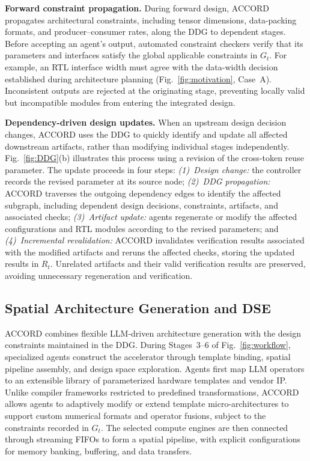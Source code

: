 \documentclass[9pt,conference]{IEEEtran}
\begin{document}
\textbf{Forward constraint propagation.}
During forward design, ACCORD propagates architectural constraints, including tensor dimensions, data-packing formats, and producer--consumer rates, along the DDG to dependent stages. Before accepting an agent's output, automated constraint checkers verify that its parameters and interfaces satisfy the global applicable constraints in $G_t$. For example, an RTL interface width must agree with the data-width decision established during architecture planning (Fig.~\ref{fig:motivation}, Case~A). Inconsistent outputs are rejected at the originating stage, preventing locally valid but incompatible modules from entering the integrated design.

\textbf{Dependency-driven design updates.}
When an upstream design decision changes, ACCORD uses the DDG to quickly identify and update all affected downstream artifacts, rather than modifying individual stages independently. Fig.~\ref{fig:DDG}(b) illustrates this process using a revision of the cross-token reuse parameter. The update proceeds in four steps:
\emph{(1)~Design change:} the controller records the revised parameter at its source node;
\emph{(2)~DDG propagation:} ACCORD traverses the outgoing dependency edges to identify the affected subgraph, including dependent design decisions, constraints, artifacts, and associated checks;
\emph{(3)~Artifact update:} agents regenerate or modify the affected configurations and RTL modules according to the revised parameters; and
\emph{(4)~Incremental revalidation:} ACCORD invalidates verification results associated with the modified artifacts and reruns the affected checks, storing the updated results in $R_t$.
Unrelated artifacts and their valid verification results are preserved, avoiding unnecessary regeneration and verification.

\subsection{Spatial Architecture Generation and DSE}
ACCORD combines flexible LLM-driven architecture generation with the design constraints maintained in the DDG. During Stages~3--6 of Fig.~\ref{fig:workflow}, specialized agents construct the accelerator through template binding, spatial pipeline assembly, and design space exploration. Agents first map LLM operators to an extensible library of parameterized hardware templates and vendor IP. Unlike compiler frameworks restricted to predefined transformations, ACCORD allows agents to adaptively modify or extend template micro-architectures to support custom numerical formats and operator fusions, subject to the constraints recorded in $G_t$. The selected compute engines are then connected through streaming FIFOs to form a spatial pipeline, with explicit configurations for memory banking, buffering, and data transfers.
\end{document}
